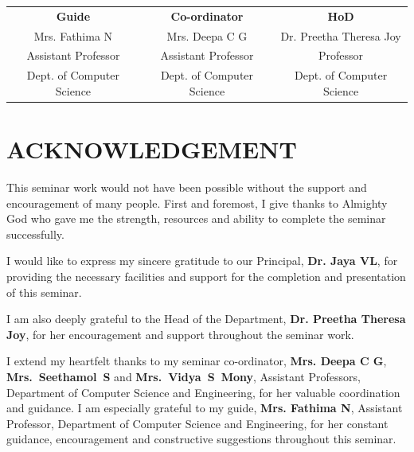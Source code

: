 \documentclass[12pt,a4paper]{report}
\newcommand{\guidename}{Mrs. Fathima N}
\newcommand{\coordinator}{Mrs. Deepa C G}
\newcommand{\hodname}{Dr. Preetha Theresa Joy}
\newcommand{\principalname}{Dr. Jaya VL}
\begin{document}
\vspace{1.2cm}
\begin{center}
\begin{tabular}{@{}c@{\hspace{0.45cm}}c@{\hspace{0.45cm}}c@{}}
\textbf{Guide} & \textbf{Co-ordinator} & \textbf{HoD}\\[0.75cm]

\parbox[c][0.55cm][c]{4.3cm}{\centering \guidename} &
\parbox[c][0.55cm][c]{4.3cm}{\centering \coordinator} &
\parbox[c][0.55cm][c]{4.3cm}{\centering \hodname}\\[0.25cm]

\parbox[c][0.45cm][c]{4.3cm}{\centering Assistant Professor} &
\parbox[c][0.45cm][c]{4.3cm}{\centering Assistant Professor} &
\parbox[c][0.45cm][c]{4.3cm}{\centering Professor}\\[0.25cm]

\parbox[c][1.35cm][c]{4.3cm}{\centering \small Dept. of Computer Science} &
\parbox[c][1.35cm][c]{4.3cm}{\centering \small Dept. of Computer Science} &
\parbox[c][1.35cm][c]{4.3cm}{\centering \small Dept. of Computer Science}

\end{tabular}
\end{center}

\newpage


\chapter*{ACKNOWLEDGEMENT}
This seminar work would not have been possible without the support and encouragement of many people. First and foremost, I give thanks to Almighty God who gave me the strength, resources and ability to complete the seminar successfully.

I would like to express my sincere gratitude to our Principal, \textbf{\principalname}, for providing the necessary facilities and support for the completion and presentation of this seminar. 

I am also deeply grateful to the Head of the Department, \textbf{\hodname}, for her encouragement and support throughout the seminar work.

I extend my heartfelt thanks to my seminar co-ordinator, \textbf{\coordinator},\\\textbf{Mrs.~Seethamol~S} and \textbf{Mrs.~Vidya~S~Mony}, Assistant Professors, Department of Computer Science and Engineering, for her valuable coordination and guidance. I am especially grateful to my guide, \textbf{\guidename}, Assistant Professor, Department of Computer Science and Engineering, for her constant guidance, encouragement and constructive suggestions throughout this seminar.
\end{document}
